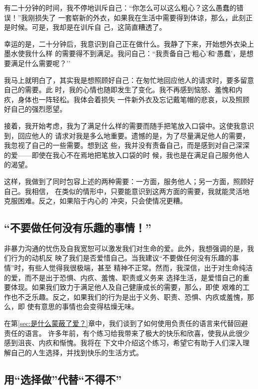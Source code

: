 \documentclass{ctexart}
\newcommand{\secref}[1]{第\ref{#1}章}
\begin{document}
有二十分钟的时间，我不停地训斥自己：``你怎么可以这么粗心？这么愚蠢的错误！''我刚损失了
一套崭新的外衣，如果我在生活中需要得到体谅，那么，此刻正是时候。可是，我却是在训斥自
己，这简直糟透了。

幸运的是，二十分钟后，我意识到自己正在做什么。我静了下来，开始想外衣染上墨水使我什么样
的需要得不到满足。我问自己：``我责备自己`粗心'和`愚蠢'，是想要满足什么需要呢？''

我马上就明白了，其实我是想照顾好自己：在匆忙地回应他人的请求时，要多留意自己的需要。此
时，我的心情也随即发生了变化。我不再感到恼怒、羞愧和内疚，身体也一阵轻松。我体会着损失
一件新外衣及忘记戴笔帽的悲哀，以及照顾好自己的强烈愿望。

接着，我开始考虑，我为了满足什么样的需要而随手把笔放入口袋中。这使我意识到，回应他人的
请求对我是多么地重要。遗憾的是，为了尽量满足他人的需要，我忽视了自己的一些需要。想到这
些，我并没有责备自己，而是感到对自己深深的爱------即使在我心不在焉地把笔放入口袋的时
候，我也是在满足自己服务他人的渴望。

这样，我做到了同时包容上述的两种需要：一方面，服务他人；另一方面，照顾好自己。我相信，
在类似的情形中，只要能意识到这两方面的需要，我就能灵活地克服困难。反之，如果陷于内心的
冲突，只会使情况更糟。


\subsection{``不要做任何没有乐趣的事情！''}

非暴力沟通的忧伤及自我宽恕可以激发我们对生命的爱。此外，我想强调的是，我们行为的动机反
映了我们是否爱惜自己。当我建议``不要做任何没有乐趣的事情''时，有些人觉得我很极端，甚至
精神不正常。然而，我深信，出于对生命纯洁的爱，而不是出于恐惧、内疚、羞愧、职责或义务来
选择生活，是爱惜自己的重要体现。如果我们致力于满足他人及自己健康成长的需要，那么，即使
艰难的工作也不乏乐趣。反之，如果我们的行为是出于义务、职责、恐惧、内疚或羞愧，那么，即
使有意思的事情也会变得枯燥无味。

在\secref{sec:是什么蒙蔽了爱？}中，我们谈到了如何使用负责任的语言来代替回避责任的语言。
许多年前，有个练习给我带来了极大的快乐和欣喜，使我从此很少感到沮丧、内疚和惭愧。我将在
下文中介绍这个练习，希望它有助于人们深入理解自己的人生选择，并找到快乐的生活方式。


\subsection{用``选择做''代替``不得不''}
\end{document}
